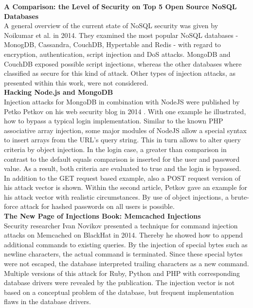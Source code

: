 \textbf{A Comparison: the Level of Security on Top 5 Open Source NoSQL Databases} \cite{Noiumkar:2014} \\
A general overview of the current state of NoSQL security was given by Noikumar et al. in 2014. They examined the most popular NoSQL databases - MonogDB, Cassandra, CouchDB, Hypertable and Redis - with regard to encryption, authentication, script injection and DoS attacks. MongoDB and CouchDB exposed possible script injections, whereas the other databases where classified as secure for this kind of attack. Other types of injection attacks, as presented within this work, were not considered. \\

\textbf{Hacking Node.js and MongoDB}\cite{Petkov:2014a, Petkov:2014b} \\
Injection attacks for MongoDB in combination with NodeJS were published by Petko Petkov on his web security blog in 2014 \cite{Petkov:2014a, Petkov:2014b}. With one example he illustrated, how to bypass a typical login implementation. Similar to the known PHP associative array injection, some major modules of NodeJS allow a special syntax to insert arrays from the URL's query string. This in turn allows to alter query criteria by object injection. In the login case, a greater than comparison in contrast to the default equals comparison is inserted for the user and password value. As a result, both criteria are evaluated to true and the login is bypassed. In addition to the GET request based example, also a POST request version of his attack vector is shown. Within the second article, Petkov gave an example for his attack vector with realistic circumstances. By use of object injections, a brute-force attack for hashed passwords on all users is possible.\\

\textbf{The New Page of Injections Book: Memcached Injections} \cite{Novikov:2014} \\
Security researcher Ivan Novikov presented a technique for command injection attacks on Memcached on BlackHat in 2014. Thereby he showed how to append additional commands to existing queries. By the injection of special bytes such as newline characters, the actual command is terminated. Since these special bytes were not escaped, the database interpreted trailing characters as a new command. Multiple versions of this attack for Ruby, Python and PHP with corresponding database drivers were revealed by the publication. The injection vector is not based on a conceptual problem of the database, but frequent implementation flaws in the database drivers. \\

